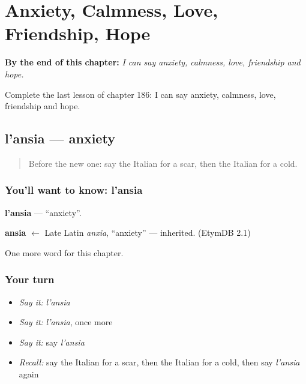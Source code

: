 
\chapter{Anxiety, Calmness, Love, Friendship, Hope}
\label{ch:it-anxiety-calmness-love-friendship-hope}

\begin{chapteropening}
\textbf{By the end of this chapter:} \emph{I can say anxiety, calmness, love, friendship and hope.}

Complete the last lesson of chapter 186: I can say anxiety, calmness, love, friendship and hope.
\end{chapteropening}

\section[l'ansia]{l'ansia — anxiety}

\label{lesson:IT-C186-ansia}



\begin{quote}
Before the new one: say the Italian for a scar, then the Italian for a cold.
\end{quote}

\subsection*{You'll want to know: l'ansia}
\textbf{l'ansia} — \textquotedblleft{}anxiety\textquotedblright{}.

\begin{cousinweb}
\textbf{ansia} $\leftarrow$ Late Latin \emph{anxia}, \textquotedblleft{}anxiety\textquotedblright{} — inherited. (EtymDB 2.1)
\end{cousinweb}

\begin{grammarlens}[title={What you've built}]
One more word for this chapter.
\end{grammarlens}

\subsection*{Your turn}
\begin{itemize}
\raggedright
  \item \emph{Say it:} \emph{l'ansia}
  \item \emph{Say it:} \emph{l'ansia}, once more
  \item \emph{Say it:} say \emph{l'ansia}
  \item \emph{Recall:} say the Italian for a scar, then the Italian for a cold, then say \emph{l'ansia} again
\end{itemize}


